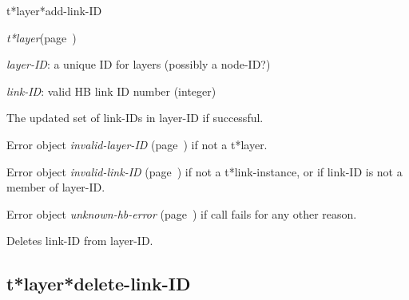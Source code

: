 \begin{description}
\item [Name:]  t*layer*add-link-ID

\item [Class:] {\sl t*layer}\hfill(page~\pageref{t*layer})

\item [Parameters:]
\item {\sl layer-ID}:  a unique ID for layers (possibly a node-ID?)


\item {\sl link-ID}:  
valid HB link ID number (integer)


\item [Return-value:]
The updated set of link-IDs in layer-ID if successful.

Error object {\sl invalid-layer-ID} (page~\pageref{invalid-layer-ID}) if not a t*layer.

Error object {\sl invalid-link-ID} (page~\pageref{invalid-link-ID}) if not a
t*link-instance, or if link-ID is not a member of 
layer-ID.

Error object {\sl unknown-hb-error} (page~\pageref{unknown-hb-error}) if call fails
for any other reason.

\item [Description:]

Deletes link-ID from layer-ID.

\item [Public:]



\end{description}
\horizontalline

\subsection{t*layer*delete-link-ID}
\label{t*layer*delete-link-ID}

